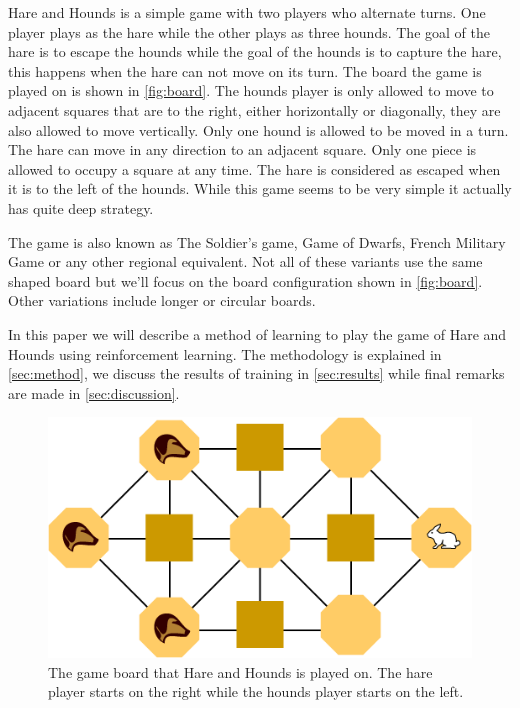 Hare and Hounds is a simple game with two players who alternate turns. One
player plays as the hare while the other plays as three hounds. The goal of the
hare is to escape the hounds while the goal of the hounds is to capture the
hare, this happens when the hare can not move on its turn. The board the game
is played on is shown in \autoref{fig:board}. The hounds player is only allowed
to move to adjacent squares that are to the right, either horizontally or
diagonally, they are also allowed to move vertically. Only one hound is allowed
to be moved in a turn. The hare can move in any direction to an adjacent
square. Only one piece is allowed to occupy a square at any time. The hare is
considered as escaped when it is to the left of the hounds. While this game
seems to be very simple it actually has quite deep strategy.

The game is also known as The Soldier's game, Game of Dwarfs, French Military
Game or any other regional equivalent. Not all of these variants use the same
shaped board but we'll focus on the board configuration shown in
\autoref{fig:board}. Other variations include longer or circular boards.


In this paper we will describe a method of learning to play the game of Hare
and Hounds using reinforcement learning. The methodology is explained in
\autoref{sec:method}, we discuss the results of training in
\autoref{sec:results} while final remarks are made in \autoref{sec:discussion}.

\begin{figure}[h]
	\centering
	\includegraphics[width=.75\textwidth]{Hare_and_Hounds_board}
	\caption{The game board that Hare and Hounds is played on. The hare player
		starts on the right while the hounds player starts on the left.}
	\label{fig:board}
\end{figure}